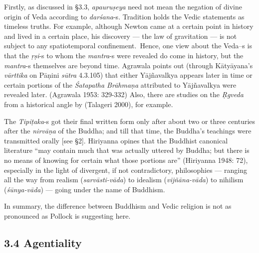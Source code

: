 Firstly, as discussed in §3.3, \textit{apauruṣeya} need not mean the negation of divine origin of Veda according to \textit{darśana}-s. Tradition holds the Vedic statements as timeless truths. For example, although Newton came at a certain point in history and lived in a certain place, his discovery — the law of gravitation — is not subject to any spatiotemporal confinement.~Hence, one view about the Veda--s is that the \textit{ṛṣi}-s to whom the \textit{mantra}-s were revealed do come in history, but the \textit{mantra}-s themselves are beyond time. Agrawala points out (through Kātyāyana’s \textit{vārttika} on Pāṇini \textit{sūtra }4.3.105) that either Yājñavalkya appears later in time or certain portions of the \textit{Śatapatha Brāhmaṇa }attributed to Yājñavalkya were revealed later. (Agrawala 1953: 329-332) Also, there are studies on the \textit{Ṛgveda} from a historical angle by (Talageri 2000), for example.

The \textit{Tipiṭaka}-s got their final written form only after about two or three centuries after the \textit{nirvāṇa } of the Buddha; and till that time, the Buddha’s teachings were transmitted orally [see §2]. Hiriyanna opines that the Buddhist canonical literature “may contain much that was actually uttered by Buddha; but there is no means of knowing for certain what those portions are” (Hiriyanna 1948: 72), especially in the light of divergent, if not contradictory, philosophies — ranging all the way from realism (\textit{sarvāsti-vāda}) to idealism (\textit{vijñāna-vāda}) to nihilism (\textit{śūnya-vāda}) — going under the name of Buddhism.

In summary, the difference between Buddhism and Vedic religion is not as pronounced as Pollock is suggesting here. 


\subsection*{3.4 Agentiality}

